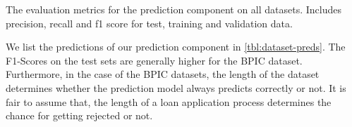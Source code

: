 \documentclass[./../../paper.tex]{subfiles}
\begin{document}
\begin{table}[htbp]
        \makebox[\linewidth]{
            
            }
            \caption{The evaluation metrics for the prediction component on all datasets. Includes precision, recall and f1 score for test, training and validation data.}
            \label{tbl:dataset-preds}
\end{table}

We list the predictions of our prediction component in \autoref{tbl:dataset-preds}. The F1-Scores on the test sets are generally higher for the BPIC dataset. Furthermore, in the case of the BPIC datasets, the length of the dataset determines whether the prediction model always predicts correctly or not. It is fair to assume that, the length of a loan application process determines the chance for getting rejected or not. 
\end{document}
